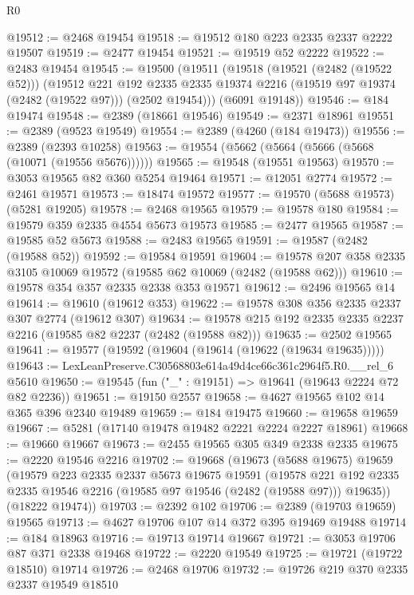 \begin{lexlean}{R0}
\begin{coremodule}
@19512 := @2468 @19454
@19518 := @19512 @180 @223 @2335 @2337 @2222 @19507
@19519 := @2477 @19454
@19521 := @19519 @52 @2222
@19522 := @2483 @19454
@19545 := @19500
    (@19511
      (@19518
        (@19521 (@2482 (@19522 @52)))
        (@19512
          @221
          @192
          @2335
          @2335
          @19374
          @2216
          (@19519 @97 @19374 (@2482 (@19522 @97)))
          (@2502 @19454)))
      (@6091 @19148))
@19546 := @184 @19474
@19548 := @2389 (@18661 @19546)
@19549 := @2371 @18961
@19551 := @2389 (@9523 @19549)
@19554 := @2389 (@4260 (@184 @19473))
@19556 := @2389 (@2393 @10258)
@19563 := @19554 (@5662 (@5664 (@5666 (@5668 (@10071 (@19556 @5676))))))
@19565 := @19548 (@19551 @19563)
@19570 := @3053 @19565 @82 @360 @5254 @19464
@19571 := @12051 @2774
@19572 := @2461 @19571
@19573 := @18474 @19572
@19577 := @19570 (@5688 @19573) (@5281 @19205)
@19578 := @2468 @19565
@19579 := @19578 @180
@19584 := @19579 @359 @2335 @4554 @5673 @19573
@19585 := @2477 @19565
@19587 := @19585 @52 @5673
@19588 := @2483 @19565
@19591 := @19587 (@2482 (@19588 @52))
@19592 := @19584 @19591
@19604 := @19578 @207 @358 @2335 @3105 @10069 @19572 (@19585 @62 @10069 (@2482 (@19588 @62)))
@19610 := @19578 @354 @357 @2335 @2338 @353 @19571
@19612 := @2496 @19565 @14
@19614 := @19610 (@19612 @353)
@19622 := @19578 @308 @356 @2335 @2337 @307 @2774 (@19612 @307)
@19634 := @19578 @215 @192 @2335 @2335 @2237 @2216 (@19585 @82 @2237 (@2482 (@19588 @82)))
@19635 := @2502 @19565
@19641 := @19577 (@19592 (@19604 (@19614 (@19622 (@19634 @19635)))))
@19643 := LexLeanPreserve.C30568803e614a49d4ce66c361c2964f5.R0.__rel_6 @5610
@19650 := @19545 (fun ("_" : @19151) => @19641 (@19643 @2224 @72 @82 @2236))
@19651 := @19150 @2557
@19658 := @4627 @19565 @102 @14 @365 @396 @2340 @19489
@19659 := @184 @19475
@19660 := @19658 @19659
@19667 := @5281 (@17140 @19478 @19482 @2221 @2224 @2227 @18961)
@19668 := @19660 @19667
@19673 := @2455 @19565 @305 @349 @2338 @2335
@19675 := @2220 @19546 @2216
@19702 := @19668
    (@19673
      (@5688 @19675)
      @19659
      (@19579
        @223
        @2335
        @2337
        @5673
        @19675
        @19591
        (@19578 @221 @192 @2335 @2335 @19546 @2216 (@19585 @97 @19546 (@2482 (@19588 @97))) @19635))
      (@18222 @19474))
@19703 := @2392 @102
@19706 := @2389 (@19703 @19659) @19565
@19713 := @4627 @19706 @107 @14 @372 @395 @19469 @19488
@19714 := @184 @18963
@19716 := @19713 @19714 @19667
@19721 := @3053 @19706 @87 @371 @2338 @19468
@19722 := @2220 @19549
@19725 := @19721 (@19722 @18510) @19714
@19726 := @2468 @19706
@19732 := @19726 @219 @370 @2335 @2337 @19549 @18510

\end{coremodule}
\end{lexlean}
